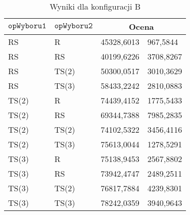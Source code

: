 \documentclass[twoside]{iisthesis}
\newcommand{\param}[1]{\mathtt{#1}}
\begin{document}
\begin{table}[h]
	\caption{Wyniki dla konfiguracji B \label{table:tsp_results_compare_b}}
	\centering
	\begin{tabular}{|l|l|r@{$\pm$}l|}
		\hline
		\multicolumn{1}{|c|}{{\bf $\param{opWyboru1}$}} & \multicolumn{1}{c|}{{\bf $\param{opWyboru2}$}} & \multicolumn{2}{c|}{{\bf Ocena}} \\ \hline \hline
		RS                             & R                             & 45328,6013      & 967,5844       \\ \hline
		RS                             & RS                            & 40199,6226      & 3708,8267      \\ \hline
		RS                             & TS(2)                         & 50300,0517      & 3010,3629      \\ \hline
		RS                             & TS(3)                         & 58433,2242      & 2810,0883      \\ \hline
		TS(2)                          & R                             & 74439,4152      & 1775,5433      \\ \hline
		TS(2)                          & RS                            & 69344,7388      & 7985,2835      \\ \hline
		TS(2)                          & TS(2)                         & 74102,5322      & 3456,4116      \\ \hline
		TS(2)                          & TS(3)                         & 75613,0044      & 1278,5291      \\ \hline
		TS(3)                          & R                             & 75138,9453      & 2567,8802      \\ \hline
		TS(3)                          & RS                            & 73942,4747      & 2489,2511      \\ \hline
		TS(3)                          & TS(2)                         & 76817,7884      & 4239,8301      \\ \hline
		TS(3)                          & TS(3)                         & 78242,0359      & 3940,9643      \\ \hline
	\end{tabular}
\end{table}
\end{document}
